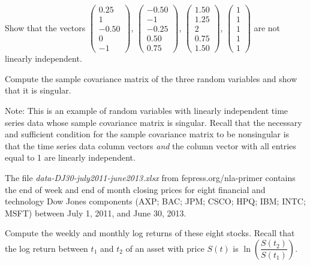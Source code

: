 \begin{exercises}
\begin{subparts}
\item Show that the vectors
$\begin{pmatrix} 0.25 \\ 1 \\ -0.50 \\ 0 \\ -1 \end{pmatrix}$,
$\begin{pmatrix} -0.50 \\ -1 \\ -0.25 \\ 0.50 \\ 0.75 \end{pmatrix}$,
$\begin{pmatrix} 1.50 \\ 1.25 \\ 2 \\ 0.75 \\ 1.50 \end{pmatrix}$,
$\begin{pmatrix} 1 \\ 1 \\ 1 \\ 1 \\ 1 \end{pmatrix}$ are not linearly independent.

\item Compute the sample covariance matrix of the three random variables and show that
it is singular.
\end{subparts}

\noindent Note: This is an example of random variables with linearly independent time
series data whose sample covariance matrix is singular. Recall that the necessary and
sufficient condition for the sample covariance matrix to be nonsingular is that the time
series data column vectors \emph{and} the column vector with all entries equal to 1 are
linearly independent.

\item The file \emph{data-DJ30-july2011-june2013.xlsx} from fepress.org/nla-primer
contains the end of week and end of month closing prices for eight financial and
technology Dow Jones components (AXP; BAC; JPM; CSCO; HPQ; IBM; INTC; MSFT) between July
1, 2011, and June 30, 2013.

\begin{subparts}
\item Compute the weekly and monthly log returns of these eight stocks. Recall that the
log return between $t_1$ and $t_2$ of an asset with price $S(t)$ is
$\ln\!\left(\dfrac{S(t_2)}{S(t_1)}\right)$.


\end{subparts}
\end{exercises}
